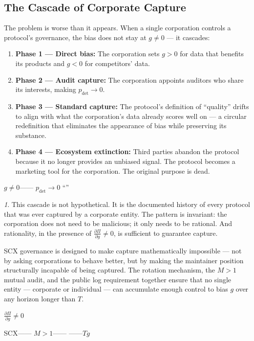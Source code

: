 \documentclass[12pt,a4paper]{article}
\theoremstyle{remark}
\newtheorem{govnote}{}[section]
\newenvironment{govbox}{%
  \begin{center}
  \color{blue}
  \begin{minipage}{0.92\textwidth}
  \begin{govnote}
}{%
  \end{govnote}
  \end{minipage}
  \end{center}
}
\begin{document}
\subsection{The Cascade of Corporate Capture}

The problem is worse than it appears. When a single corporation controls a
protocol's governance, the bias does not stay at $g \neq 0$ — it cascades:

\begin{enumerate}[label=(\arabic*), leftmargin=*]
    \item \textbf{Phase 1 — Direct bias:} The corporation sets $g > 0$ for data
          that benefits its products and $g < 0$ for competitors' data.
    \item \textbf{Phase 2 — Audit capture:} The corporation appoints auditors
          who share its interests, making $p_{\text{det}} \to 0$.
    \item \textbf{Phase 3 — Standard capture:} The protocol's definition of
          ``quality'' drifts to align with what the corporation's data already
          scores well on — a circular redefinition that eliminates the
          appearance of bias while preserving its substance.
    \item \textbf{Phase 4 — Ecosystem extinction:} Third parties abandon the
          protocol because it no longer provides an unbiased signal. The
          protocol becomes a marketing tool for the corporation. The original
          purpose is dead.
\end{enumerate}

\noindent\textbf{}
$g \neq 0$——
$p_{\text{det}} \to 0$
“”


\begin{govbox}
This cascade is not hypothetical. It is the documented history of every protocol
that was ever captured by a corporate entity. The pattern is invariant: the
corporation does not need to be malicious; it only needs to be rational. And
rationality, in the presence of $\frac{\partial \Pi}{\partial g} \neq 0$, is
sufficient to guarantee capture.

SCX governance is designed to make capture mathematically impossible — not by
asking corporations to behave better, but by making the maintainer position
structurally incapable of being captured. The rotation mechanism, the $M > 1$
mutual audit, and the public log requirement together ensure that no single
entity — corporate or individual — can accumulate enough control to bias $g$
over any horizon longer than $T$.

\begin{center}
\small\textbf{}

$\frac{\partial \Pi}{\partial g} \neq 0$


SCX——
$M>1$——
——$T$$g$
\end{center}
\end{govbox}
\end{document}
